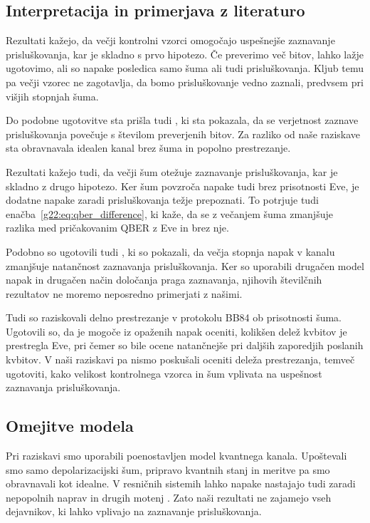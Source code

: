 \subsection{Interpretacija in primerjava z literaturo}
\label{g22:sec:interpretacija}

Rezultati kažejo, da večji kontrolni vzorci omogočajo uspešnejše zaznavanje prisluškovanja, kar je skladno s prvo hipotezo. Če preverimo več bitov, lahko
lažje ugotovimo, ali so napake posledica samo
šuma ali tudi prisluškovanja. Kljub temu pa
večji vzorec ne zagotavlja, da bomo prisluškovanje
vedno zaznali, predvsem pri višjih stopnjah šuma.

Do podobne ugotovitve sta prišla tudi
\citet{g22:mina2020scalable}, ki sta pokazala,
da se verjetnost zaznave prisluškovanja
povečuje s številom preverjenih bitov.
Za razliko od naše raziskave sta obravnavala
idealen kanal brez šuma in popolno prestrezanje.


Rezultati kažejo tudi, da večji šum otežuje
zaznavanje prisluškovanja, kar je skladno
z drugo hipotezo. Ker šum povzroča napake
tudi brez prisotnosti Eve, je dodatne napake
zaradi prisluškovanja težje prepoznati.
To potrjuje tudi enačba~\eqref{g22:eq:qber_difference},
ki kaže, da se z večanjem šuma zmanjšuje
razlika med pričakovanim QBER z Eve in brez nje.

Podobno so ugotovili tudi
\citet{g22:lee2023detection}, ki so pokazali,
da večja stopnja napak v kanalu zmanjšuje
natančnost zaznavanja prisluškovanja.
Ker so uporabili drugačen model napak in
drugačen način določanja praga zaznavanja,
njihovih številčnih rezultatov ne moremo
neposredno primerjati z našimi.


Tudi \citet{g22:fiorini2024estimating}
so raziskovali delno prestrezanje v protokolu
BB84 ob prisotnosti šuma. Ugotovili so,
da je mogoče iz opaženih napak oceniti,
kolikšen delež kvbitov je prestregla Eve,
pri čemer so bile ocene natančnejše pri
daljših zaporedjih poslanih kvbitov.
V naši raziskavi pa nismo poskušali
oceniti deleža prestrezanja, temveč
ugotoviti, kako velikost kontrolnega vzorca
in šum vplivata na uspešnost zaznavanja
prisluškovanja.


\subsection{Omejitve modela}
\label{g22:sec:omejitve}

Pri raziskavi smo uporabili poenostavljen model
kvantnega kanala. Upoštevali smo samo
depolarizacijski šum, pripravo kvantnih stanj
in meritve pa smo obravnavali kot idealne.
V resničnih sistemih lahko napake nastajajo
tudi zaradi nepopolnih naprav in drugih motenj
\cite{g22:lee2023detection}. Zato naši rezultati
ne zajamejo vseh dejavnikov, ki lahko vplivajo
na zaznavanje prisluškovanja.

